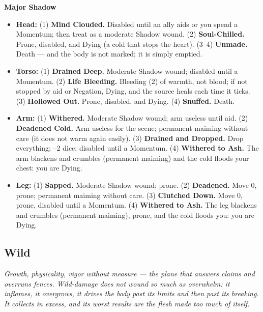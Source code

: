 \textbf{Major Shadow}
\begin{itemize}
    \item \textbf{Head:} (1) \textbf{Mind Clouded.} Disabled until an ally aids or you spend a Momentum; then treat as a moderate Shadow wound. (2) \textbf{Soul-Chilled.} Prone, disabled, and Dying (a cold that stops the heart). (3--4) \textbf{Unmade.} Death --- and the body is not marked; it is simply emptied.
    \item \textbf{Torso:} (1) \textbf{Drained Deep.} Moderate Shadow wound; disabled until a Momentum. (2) \textbf{Life Bleeding.} Bleeding (2) of warmth, not blood; if not stopped by aid or Negation, Dying, and the source heals each time it ticks. (3) \textbf{Hollowed Out.} Prone, disabled, and Dying. (4) \textbf{Snuffed.} Death.
    \item \textbf{Arm:} (1) \textbf{Withered.} Moderate Shadow wound; arm useless until aid. (2) \textbf{Deadened Cold.} Arm useless for the scene; permanent maiming without care (it does not warm again easily). (3) \textbf{Drained and Dropped.} Drop everything; --2 dice; disabled until a Momentum. (4) \textbf{Withered to Ash.} The arm blackens and crumbles (permanent maiming) and the cold floods your chest: you are Dying.
    \item \textbf{Leg:} (1) \textbf{Sapped.} Moderate Shadow wound; prone. (2) \textbf{Deadened.} Move 0, prone; permanent maiming without care. (3) \textbf{Clutched Down.} Move 0, prone, disabled until a Momentum. (4) \textbf{Withered to Ash.} The leg blackens and crumbles (permanent maiming), prone, and the cold floods you: you are Dying.
\end{itemize}

\subsection{Wild}

\textit{Growth, physicality, vigor without measure --- the plane that answers claims and overruns fences. Wild-damage does not wound so much as \textit{overwhelm}: it inflames, it overgrows, it drives the body past its limits and then past its breaking. It collects in excess, and its worst results are the flesh made too much of itself.}


